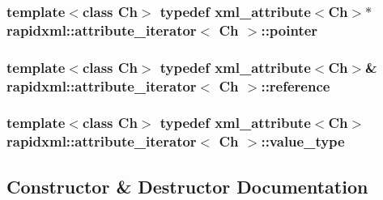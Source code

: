 \subsubsection[{pointer}]{\setlength{\rightskip}{0pt plus 5cm}template$<$class Ch$>$ typedef {\bf xml\+\_\+attribute}$<$Ch$>$$\ast$ {\bf rapidxml\+::attribute\+\_\+iterator}$<$ Ch $>$\+::{\bf pointer}}\label{classrapidxml_1_1attribute__iterator_a69acc2e60270d6a062c03c9cb1cf2aa7}
\hypertarget{classrapidxml_1_1attribute__iterator_a097343e44557de14de86b470d3f917d9}{}
\subsubsection[{reference}]{\setlength{\rightskip}{0pt plus 5cm}template$<$class Ch$>$ typedef {\bf xml\+\_\+attribute}$<$Ch$>$\& {\bf rapidxml\+::attribute\+\_\+iterator}$<$ Ch $>$\+::{\bf reference}}\label{classrapidxml_1_1attribute__iterator_a097343e44557de14de86b470d3f917d9}
\hypertarget{classrapidxml_1_1attribute__iterator_ad4280d358828ad9c3eb1a787decb162e}{}
\subsubsection[{value\+\_\+type}]{\setlength{\rightskip}{0pt plus 5cm}template$<$class Ch$>$ typedef {\bf xml\+\_\+attribute}$<$Ch$>$ {\bf rapidxml\+::attribute\+\_\+iterator}$<$ Ch $>$\+::{\bf value\+\_\+type}}\label{classrapidxml_1_1attribute__iterator_ad4280d358828ad9c3eb1a787decb162e}


\subsection{Constructor \& Destructor Documentation}
\hypertarget{classrapidxml_1_1attribute__iterator_a30a82132793bc59d4e7b20f5be6237b9}{}
